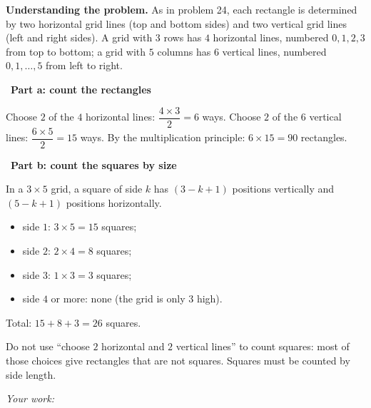 \documentclass[11pt]{article}
\newif\ifsol \solfalse
\newcommand{\probsol}[1]{%
  \begin{lrbox}{\solmeasure}\begin{minipage}{\dimexpr\linewidth-24pt\relax}#1\end{minipage}\end{lrbox}%
  \ifsol
    \begin{solbox}#1\end{solbox}%
  \else
    \setlength{\solht}{\dimexpr\ht\solmeasure+\dp\solmeasure+0.85cm\relax}%
    \ifdim\solht<1.35cm\setlength{\solht}{1.35cm}\fi
    \ifdim\solht>\StudentMaxWork\setlength{\solht}{\StudentMaxWork}\fi
    \begin{tcolorbox}[colback=white,colframe=Line,boxrule=0.8pt,arc=5pt,
      left=8pt,right=8pt,top=4pt,bottom=4pt,height=\solht]{\footnotesize\color{Slate}\itshape\WorkWord}\end{tcolorbox}%
  \fi}
\newlength{\StudentMaxWork}\setlength{\StudentMaxWork}{7.5cm}
\newcommand{\step}[2]{\par\smallskip\noindent{\bfseries\color{tmBlue!85!black}\StepWord~#1.}\ {\bfseries #2}\par\nopagebreak}
\def\WorkWord{Your work:}
\def\StepWord{Step}
\begin{document}
\probsol{
\textbf{Understanding the problem.} As in problem 24, each rectangle is determined by two horizontal grid lines (top and bottom sides) and
two vertical grid lines (left and right sides). A grid with $3$ rows has $4$ horizontal lines, numbered $0,1,2,3$ from top to bottom; a grid
with $5$ columns has $6$ vertical lines, numbered $0,1,\dots,5$ from left to right.

\step{1}{Part a: count the rectangles}
Choose $2$ of the $4$ horizontal lines: $\dfrac{4\times3}{2}=6$ ways. Choose $2$ of the $6$ vertical lines: $\dfrac{6\times5}{2}=15$ ways.
By the multiplication principle: $6\times15=90$ rectangles.

\step{2}{Part b: count the squares by size}
\begin{recallbox}In a $3\times5$ grid, a square of side $k$ has $(3-k+1)$ positions vertically and $(5-k+1)$ positions horizontally.\end{recallbox}
\begin{itemize}[leftmargin=1.2em,itemsep=1pt,topsep=2pt]
\item side $1$: $3\times5=15$ squares;
\item side $2$: $2\times4=8$ squares;
\item side $3$: $1\times3=3$ squares;
\item side $4$ or more: none (the grid is only $3$ high).
\end{itemize}
Total: $15+8+3=26$ squares.
\begin{warnbox}Do not use ``choose $2$ horizontal and $2$ vertical lines'' to count squares: most of those choices give rectangles that are not
squares. Squares must be counted by side length.\end{warnbox}

}
\end{document}
